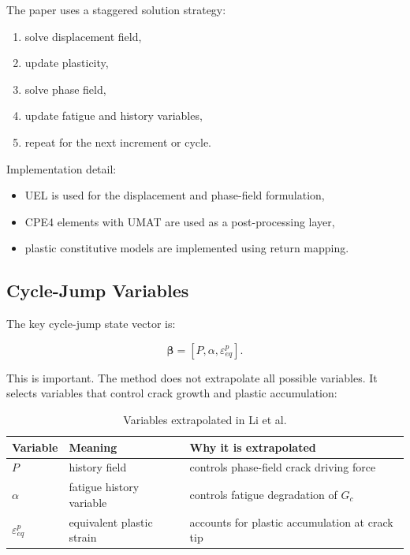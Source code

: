 \documentclass[11pt,a4paper]{article}
\begin{document}
The paper uses a staggered solution strategy:

\begin{enumerate}
    \item solve displacement field,
    \item update plasticity,
    \item solve phase field,
    \item update fatigue and history variables,
    \item repeat for the next increment or cycle.
\end{enumerate}

Implementation detail:

\begin{itemize}
    \item UEL is used for the displacement and phase-field formulation,
    \item CPE4 elements with UMAT are used as a post-processing layer,
    \item plastic constitutive models are implemented using return mapping.
\end{itemize}

\subsection{Cycle-Jump Variables}

The key cycle-jump state vector is:

\begin{equation}
\bm{\beta}
=
\left[
P,\alpha,\varepsilon_{eq}^p
\right].
\end{equation}

This is important. The method does not extrapolate all possible variables. It selects variables that control crack growth and plastic accumulation:

\begin{table}[H]
\centering
\caption{Variables extrapolated in Li et al.}
\begin{tabular}{lll}
\toprule
Variable & Meaning & Why it is extrapolated \\
\midrule
$P$ & history field & controls phase-field crack driving force \\
$\alpha$ & fatigue history variable & controls fatigue degradation of $G_c$ \\
$\varepsilon_{eq}^p$ & equivalent plastic strain & accounts for plastic accumulation at crack tip \\
\bottomrule
\end{tabular}
\end{table}
\end{document}
